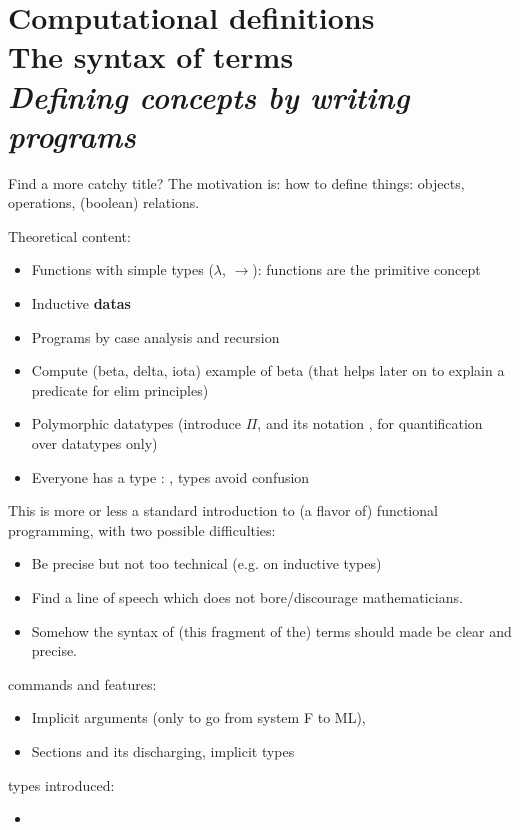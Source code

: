 \chapter{Computational definitions \\ The syntax of terms \\[2ex]\Large\itshape Defining concepts by writing programs}

Find a more catchy title? The motivation is: how to define things:
objects, operations, (boolean) relations.

Theoretical content:
\begin{itemize}
\item Functions with simple types ($\lambda$, $\rightarrow$): functions are the primitive concept
\item Inductive {\bf datas}
\item Programs by case analysis and recursion
\item Compute (beta, delta, iota) example of beta (that helps later on to explain a predicate for elim principles)
\item Polymorphic datatypes (introduce $\Pi$, and its \Coq{} notation
  , for quantification over datatypes only)
\item Everyone has a type : , types avoid confusion
\end{itemize}
This is more or less a standard introduction to (a flavor of)
functional programming, with two possible difficulties:
\begin{itemize}
\item Be precise but not too technical (e.g. on inductive types)
\item Find a line of speech which does not bore/discourage
  mathematicians.
\item Somehow the syntax of (this fragment of the) terms should made
  be clear and precise.
\end{itemize}

\Coq{} commands and features:
\begin{itemize}
\item Implicit arguments (only to go from system F to ML), 
\item Sections and its discharging, implicit types
\end{itemize}


\Coq{} types introduced:
\begin{itemize}
\item {}
\end{itemize}

